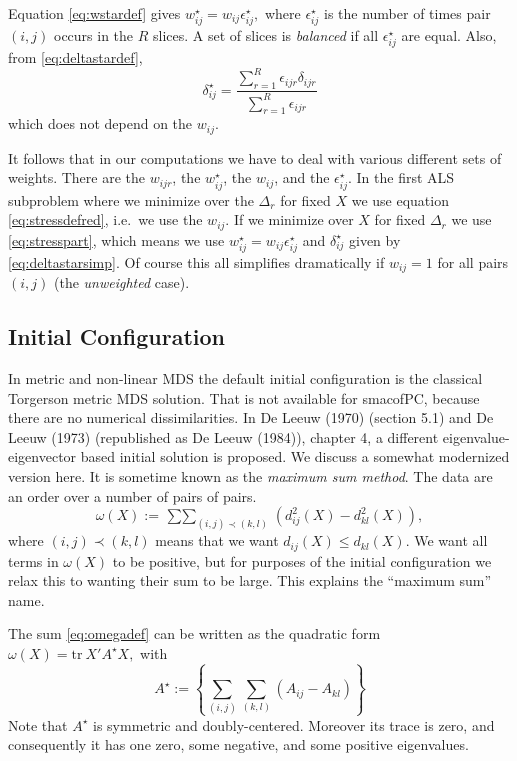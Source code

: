 \documentclass[
  12pt,
]{article}
\begin{document}
Equation \eqref{eq:wstardef} gives \(w_{ij}^\star=w_{ij}\epsilon_{ij}^\star,\)
where \(\epsilon_{ij}^\star\) is the number of times pair \((i,j)\) occurs in
the \(R\) slices. A set of slices is \emph{balanced} if all \(\epsilon_{ij}^\star\) are equal. Also, from \eqref{eq:deltastardef},
\begin{equation}
\delta_{ij}^\star=\frac{\sum_{r=1}^R \epsilon_{ijr}\delta_{ijr}}{\sum_{r=1}^R \epsilon_{ijr}}
\label{eq:deltastarsimp}
\end{equation}
which does not depend on the \(w_{ij}\).

It follows that in our computations we have to deal with various
different sets of weights. There are the \(w_{ijr}\), the \(w_{ij}^\star\),
the \(w_{ij}\), and the \(\epsilon_{ij}^\star\). In the first ALS subproblem
where we minimize over the \(\Delta_r\) for fixed \(X\) we use
equation \eqref{eq:stressdefred}, i.e.~we use the \(w_{ij}\). If we minimize over \(X\) for fixed \(\Delta_r\) we use \eqref{eq:stresspart}, which means we
use \(w_{ij}^\star=w_{ij}\epsilon_{ij}^\star\) and \(\delta_{ij}^\star\)
given by \eqref{eq:deltastarsimp}. Of course this all simplifies dramatically
if \(w_{ij}=1\) for all pairs \((i,j)\) (the \emph{unweighted} case).

\subsection{Initial Configuration}\label{initial-configuration}

In metric and non-linear MDS the default initial configuration is the
classical Torgerson metric MDS solution. That is not available for
smacofPC, because there are no numerical dissimilarities. In
De Leeuw (1970) (section 5.1) and De Leeuw (1973) (republished as De Leeuw (1984)), chapter 4, a different eigenvalue-eigenvector based initial solution is proposed. We discuss a somewhat modernized version here. It is sometime known as the \emph{maximum sum method}.
The data are an order over a number of pairs of pairs.
\begin{equation}
\omega(X):=\mathop{\sum\sum}_{(i,j)\prec(k,l)}(d_{ij}^2(X)-d_{kl}^2(X)),
\label{eq:omegadef}
\end{equation}
where \((i,j)\prec(k,l)\) means that we want \(d_{ij}(X)\leq d_{kl}(X)\).
We want all terms in \(\omega(X)\) to be positive, but for purposes of
the initial configuration we relax this to wanting their sum to be
large. This explains the ``maximum sum'' name.

The sum \eqref{eq:omegadef} can be written as the quadratic form
\(\omega(X)=\text{tr}\ X'A^\star X,\)
with
\begin{equation}
A^\star:=\left\{\sum_{(i,j)}\sum_{(k,l)}(A_{ij}-A_{kl})\right\} 
\label{eq:astardef}
\end{equation}
Note that \(A^\star\) is symmetric and doubly-centered. Moreover
its trace is zero, and consequently it has one zero, some negative,
and some positive eigenvalues.
\end{document}
